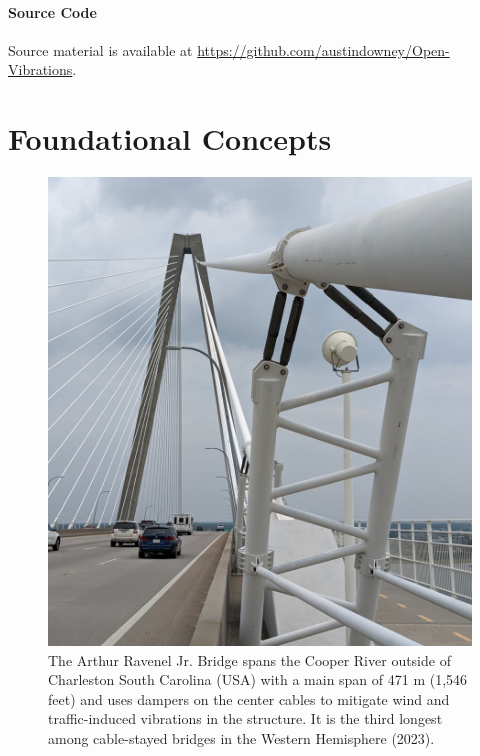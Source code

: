 \documentclass[12pt,letter]{article}
\begin{document}
\subsection{Source Code}
Source material is available at \url{https://github.com/austindowney/Open-Vibrations}.








\setcounter{secnumdepth}{3} %
\setcounter{page}{1}


\part{Foundational Concepts}

\begin{figure}[H]
	\centering
	\includegraphics[width=6.5in]{figures/Arthur_Ravenel_Jr_Bridge_dampers} \\
	The Arthur Ravenel Jr. Bridge spans the Cooper River outside of Charleston South Carolina (USA) with a main span of 471 m (1,546 feet) and uses dampers on the center cables to mitigate wind and traffic-induced vibrations in the structure. It is the third longest among cable-stayed bridges in the Western Hemisphere (2023).
\end{figure}
\end{document}
